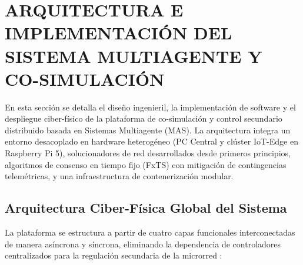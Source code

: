 \section{ARQUITECTURA E IMPLEMENTACIÓN DEL SISTEMA MULTIAGENTE Y CO-SIMULACIÓN}
\label{sec:implementacion}

En esta sección se detalla el diseño ingenieril, la implementación de software y el despliegue ciber-físico de la plataforma de co-simulación y control secundario distribuido basada en Sistemas Multiagente (MAS). La arquitectura integra un entorno desacoplado en hardware heterogéneo (PC Central y clúster IoT-Edge en Raspberry Pi 5), solucionadores de red desarrollados desde primeros principios, algoritmos de consenso en tiempo fijo (FxTS) con mitigación de contingencias telemétricas, y una infraestructura de contenerización modular.

\subsection{Arquitectura Ciber-Física Global del Sistema}

La plataforma se estructura a partir de cuatro capas funcionales interconectadas de manera asíncrona y síncrona, eliminando la dependencia de controladores centralizados para la regulación secundaria de la microrred \citep{Mamun2026, Altin2023MultiAgent}:

